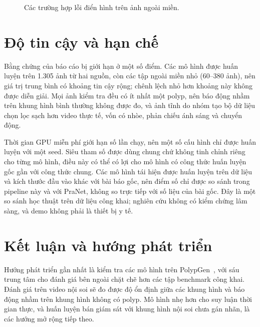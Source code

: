 \documentclass[10pt,twoside]{article}
\begin{document}
\begin{figure}[t]
\centering
{}
\caption{Các trường hợp lỗi điển hình trên ảnh ngoài miền.}\label{fig:errors}
\end{figure}

\section{Độ tin cậy và hạn chế}\label{sec:limits}
Bằng chứng của báo cáo bị giới hạn ở một số điểm. Các mô hình được huấn luyện trên
1.305 ảnh từ hai nguồn, còn các tập ngoài miền nhỏ (60--380 ảnh), nên giá trị trung bình
có khoảng tin cậy rộng; chênh lệch nhỏ hơn khoảng này không được diễn giải. Mọi ảnh
kiểm tra đều có ít nhất một polyp, nên báo động nhầm trên khung hình bình thường không
được đo, và ảnh tĩnh do nhóm tạo bộ dữ liệu chọn lọc sạch hơn video thực tế, vốn có
nhòe, phản chiếu ánh sáng và chuyển động.

Thời gian GPU miễn phí giới hạn số lần chạy, nên một số cấu hình chỉ được huấn luyện với
một seed. Siêu tham số được dùng chung chứ không tinh chỉnh riêng cho từng mô hình, điều
này có thể có lợi cho mô hình có công thức huấn luyện gốc gần với công thức chung. Các mô
hình tái hiện được huấn luyện trên dữ liệu và kích thước đầu vào khác với bài báo gốc, nên
điểm số chỉ được so sánh trong pipeline này và với PraNet, không so trực tiếp với số liệu
của bài gốc. Đây là một so sánh học thuật trên dữ liệu công khai; nghiên cứu không có
kiểm chứng lâm sàng, và demo không phải là thiết bị y tế.

\section{Kết luận và hướng phát triển}\label{sec:conclusion}

Hướng phát triển gần nhất là kiểm tra các mô hình trên PolypGen~\cite{ali2023polypgen},
với sáu trung tâm cho đánh giá bên ngoài chặt chẽ hơn các tập benchmark công khai. Đánh
giá trên video nội soi sẽ đo được độ ổn định giữa các khung hình và báo động nhầm trên
khung hình không có polyp. Mô hình nhẹ hơn cho suy luận thời gian thực, và huấn luyện bán
giám sát với khung hình nội soi chưa gán nhãn, là các hướng mở rộng tiếp theo.
\end{document}
